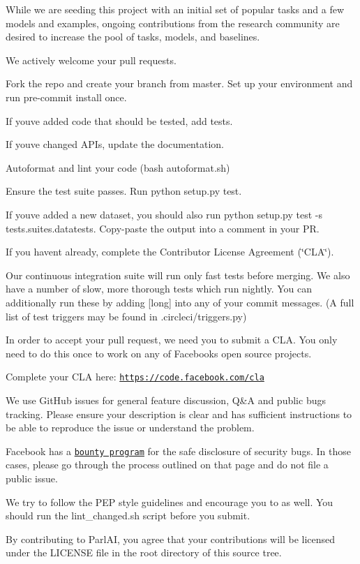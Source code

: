 While we are seeding this project with an initial set of popular tasks and a few models and examples, ongoing contributions from the research community are desired to increase the pool of tasks, models, and baselines.

We actively welcome your pull requests.


\begin{DoxyEnumerate}
\item Fork the repo and create your branch from {\ttfamily master}. Set up your environment and run {\ttfamily pre-\/commit install} once.
\item If you\textquotesingle{}ve added code that should be tested, add tests.
\item If you\textquotesingle{}ve changed A\+P\+Is, update the documentation.
\item Autoformat and lint your code ({\ttfamily bash autoformat.\+sh})
\item Ensure the test suite passes. Run {\ttfamily python setup.\+py test}.
\item If you\textquotesingle{}ve added a new dataset, you should also run {\ttfamily python setup.\+py test -\/s tests.\+suites.\+datatests}. Copy-\/paste the output into a comment in your PR.
\item If you haven\textquotesingle{}t already, complete the Contributor License Agreement (\char`\"{}\+C\+L\+A\char`\"{}).
\end{DoxyEnumerate}

Our continuous integration suite will run only fast tests before merging. We also have a number of slow, more thorough tests which run nightly. You can additionally run these by adding {\ttfamily \mbox{[}long\mbox{]}} into any of your commit messages. (A full list of test triggers may be found in {\ttfamily .circleci/triggers.\+py})

In order to accept your pull request, we need you to submit a C\+LA. You only need to do this once to work on any of Facebook\textquotesingle{}s open source projects.

Complete your C\+LA here\+: \href{https://code.facebook.com/cla}{\tt https\+://code.\+facebook.\+com/cla}

We use Git\+Hub issues for general feature discussion, Q\&A and public bugs tracking. Please ensure your description is clear and has sufficient instructions to be able to reproduce the issue or understand the problem.

Facebook has a \href{https://www.facebook.com/whitehat/}{\tt bounty program} for the safe disclosure of security bugs. In those cases, please go through the process outlined on that page and do not file a public issue.

We try to follow the P\+EP style guidelines and encourage you to as well. You should run the {\ttfamily lint\+\_\+changed.\+sh} script before you submit.

By contributing to Parl\+AI, you agree that your contributions will be licensed under the L\+I\+C\+E\+N\+SE file in the root directory of this source tree. 